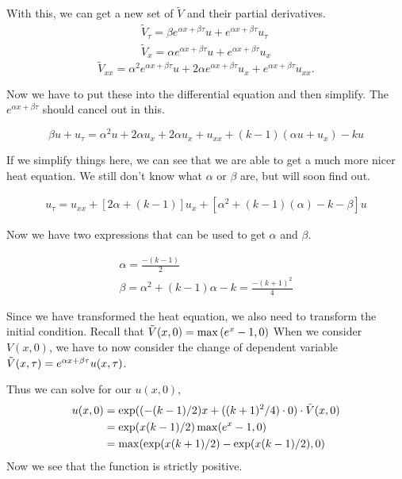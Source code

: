 \documentclass{article}
\begin{document}
With this, we can get a new set of $\tilde{V}$ and their partial derivatives.
\begin{align*}
    \tilde{V}_{\tau} = \beta e^{\alpha x + \beta \tau} u + e^{\alpha x + \beta \tau} u_{\tau} \\
    \tilde{V}_{x} = \alpha e^{\alpha x + \beta \tau} u + e^{\alpha x + \beta \tau} u_{x}
\end{align*}
\begin{equation}
    \tilde{V}_{xx} = \alpha^2 e^{\alpha x + \beta \tau} u + 2\alpha e^{\alpha x + \beta \tau} u_{x} + e^{\alpha x + \beta \tau} u_{xx}. 
\end{equation}


Now we have to put these into the differential equation and then simplify. The $e^{\alpha x + \beta \tau}$ should cancel out in this. 

\begin{equation}
    \beta u + u_{\tau} = \alpha^2 u + 2\alpha u_{x} + 2\alpha u_{x} + u_{xx} + (k-1)(\alpha u + u_{x}) - ku
\end{equation}

If we simplify things here, we can see that we are able to get a much more nicer heat equation. We still don't know what $\alpha$ or $\beta$ are, but will soon find out.

\begin{align*}
    u_{\tau} = u_{xx} + \left[ 2\alpha + (k-1) \right]u_{x} + \left[ \alpha^2 + (k-1)(\alpha)-k-\beta \right]u
\end{align*}

Now we have two expressions that can be used to get $\alpha$ and $\beta$. 

\begin{gather*}
    \alpha =  \frac{-(k-1)}{2} \\
    \beta = \alpha^2 + (k-1)\alpha - k = \frac{-(k+1)^2}{4}
\end{gather*}

Since we have transformed the heat equation, we also need to transform the initial condition. Recall that $\tilde{V}(x,0) = \max{(e^x-1, 0)}$
When we consider $V(x,0)$, we have to now consider the change of dependent variable $\tilde{V}(x,\tau) = e^{\alpha x + \beta \tau}u(x, \tau)$.




Thus we can solve for our $u(x,0)$, %
\begin{align*}
    u(x,0) &= \exp((-(k-1)/2)x + ((k+1)^2 / 4)\cdot 0) \cdot \tilde{V}(x,0) \\
           &= \exp(x(k-1)/2) \max(e^x-1,0) \\
           &= \max(\exp(x(k+1)/2) - \exp(x(k-1)/2), 0)
\end{align*}
Now we see that the function is strictly positive.
\end{document}
